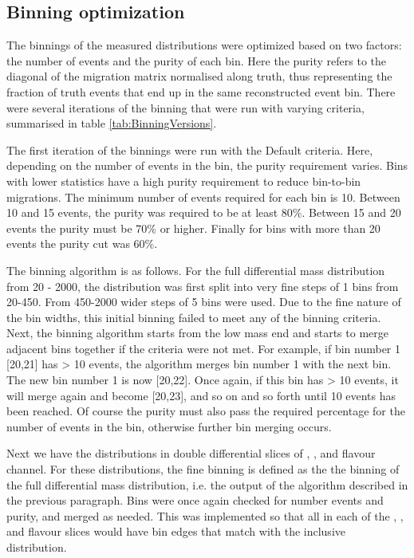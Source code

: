 \subsection{Binning optimization}
\label{subsec:binningopt}

The binnings of the measured distributions were optimized based on two factors: the number of events and the purity of each bin. Here the purity refers to the diagonal of the migration matrix normalised along truth, thus representing the fraction of truth events that end up in the same reconstructed event bin. There were several iterations of the binning that were run with varying criteria, summarised in table \ref{tab:BinningVersions}.

The first iteration of the binnings were run with the Default criteria. Here, depending on the number of events in the bin, the purity requirement varies. Bins with lower statistics have a high purity requirement to reduce bin-to-bin migrations. The minimum number of events required for each bin is 10. Between 10 and 15 events, the purity was required to be at least 80\%. Between 15 and 20 events the purity must be 70\% or higher. Finally for bins with more than 20 events the purity cut was 60\%. 

The binning algorithm is as follows. For the full \mFourL differential mass distribution from \unit{20}{\Gev} - \unit{2000}{\GeV}, the distribution was first split into very fine steps of \unit{1}{\GeV} bins from \unit{20}{\Gev}-\unit{450}{\GeV}. From \unit{450}{\Gev}-\unit{2000}{\GeV} wider steps of \unit{5}{\GeV} bins were used. Due to the fine nature of the bin widths, this initial binning failed to meet any of the binning criteria. Next, the binning algorithm starts from the low mass end and starts to merge adjacent bins together if the criteria were not met. For example, if bin number 1 [20,21] has > 10 events, the algorithm merges bin number 1 with the next bin. The new bin number 1 is now [20,22]. Once again, if this bin has > 10 events, it will merge again and become [20,23], and so on and so forth until 10 events has been reached. Of course the purity must also pass the required percentage for the number of events in the bin, otherwise further bin merging occurs.  

Next we have the \mFourL distributions in double differential slices of \ptFourL, \yFourL, and flavour channel. For these distributions, the fine binning is defined as the the binning of the full \mFourL differential mass distribution, i.e. the output of the algorithm described in the previous paragraph. Bins were once again checked for number events and purity, and merged as needed. This was implemented so that all \mFourL in each of the  \ptFourL, \yFourL, and flavour slices would have bin edges that match with the inclusive distribution. 

